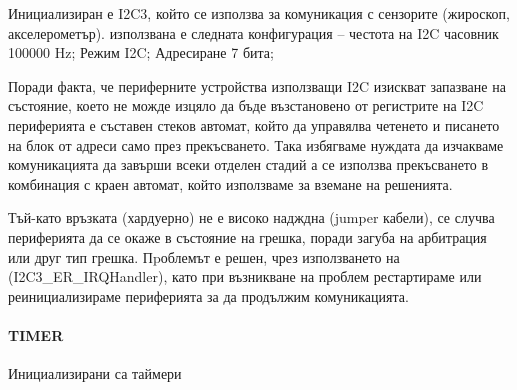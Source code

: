 Инициализиран е I2C3,
който се използва за комуникация с сензорите (жироскоп, акселерометър).
използвана е следната конфигурация --
честота на I2C часовник 100000 Hz;
Режим I2C;
Адресиране 7 бита;

Поради факта, че периферните устройства използващи I2C 
изискват запазване на състояние, което не можде изцяло да 
бъде възстановено от регистрите на I2C периферията
е съставен стеков автомат, който да управялва четенето и 
писането на блок от адреси само през прекъсването.
Така избягваме нуждата да изчакваме комуникацията да завърши
всеки отделен стадий а се използва прекъсването в комбинация
с краен автомат, който използваме за вземане на решенията.

Тъй-като връзката (хардуерно) не е високо надждна
(jumper кабели), се случва периферията да се окаже в
състояние на грешка, поради загуба на арбитрация или
друг тип грешка.
Пpоблемът е решен, чрез използването на (I2C3\_ER\_IRQHandler),
като при възникване на проблем рестартираме или реинициализираме
периферията за да продължим комуникацията.

\paragraph{TIMER}



Инициализирани са таймери 











